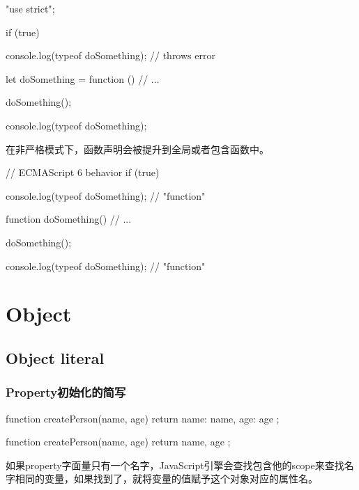 \begin{JavaScript}
"use strict";

if (true) {

    console.log(typeof doSomething);        // throws error

    let doSomething = function () {
        // ...
    }

    doSomething();
}

console.log(typeof doSomething);
\end{JavaScript}

在非严格模式下，函数声明会被提升到全局或者包含函数中。

\begin{JavaScript}
// ECMAScript 6 behavior
if (true) {

    console.log(typeof doSomething);        // "function"

    function doSomething() {
        // ...
    }

    doSomething();
}

console.log(typeof doSomething);            // "function"
\end{JavaScript}


\section{Object}

\subsection{Object literal}

\subsubsection{Property初始化的简写}

\begin{JavaScript}
function createPerson(name, age) {
    return {
        name: name,
        age: age
    };
}
\end{JavaScript}

\begin{JavaScript}
function createPerson(name, age) {
    return {
        name,
        age
    };
}
\end{JavaScript}
如果property字面量只有一个名字，JavaScript引擎会查找包含他的scope来查找名字相同的变量，如果找到了，就将变量的值赋予这个对象对应的属性名。

